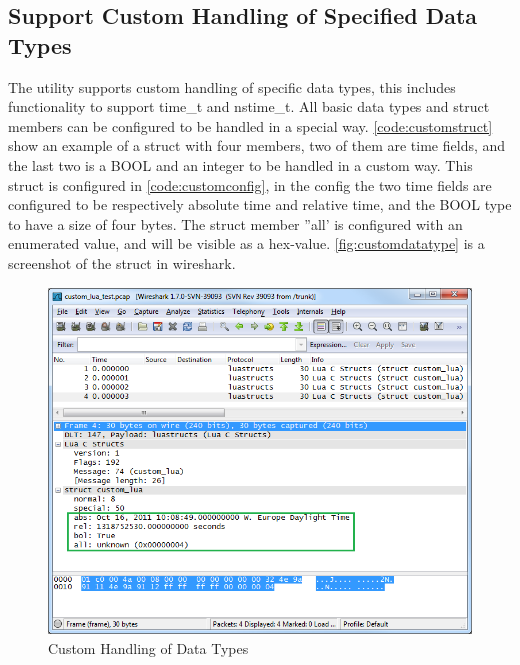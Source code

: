 \subsection{Support Custom Handling of Specified Data Types}
The \gls{utility} supports custom handling of specific data types, this includes 
functionality to support  time\_t and nstime\_t. All basic data types and 
\gls{struct} \glspl{member} can be configured to be handled in a special way. 
\autoref{code:customstruct} show an example of a \gls{struct} with four \glspl{member}, two 
of them are time fields, and the last two is a BOOL and an \gls{integer} to be 
handled in a custom way. This \gls{struct} is configured in 
\autoref{code:customconfig}, in the config the two time fields are configured 
to be respectively absolute time and relative time, and the BOOL type to have 
a size of four bytes. The \gls{struct} \gls{member} ''all' is configured with an enumerated 
value, and will be visible as a hex-value. \autoref{fig:customdatatype} is a 
screenshot of the \gls{struct} in \Gls{wireshark}.

\begin{figure}[ht]
	\center
	\includegraphics[width=\textwidth]{./sprints/img/wireshark_custom}
	\caption{Custom Handling of Data Types\label{fig:customdatatype}}
\end{figure}



